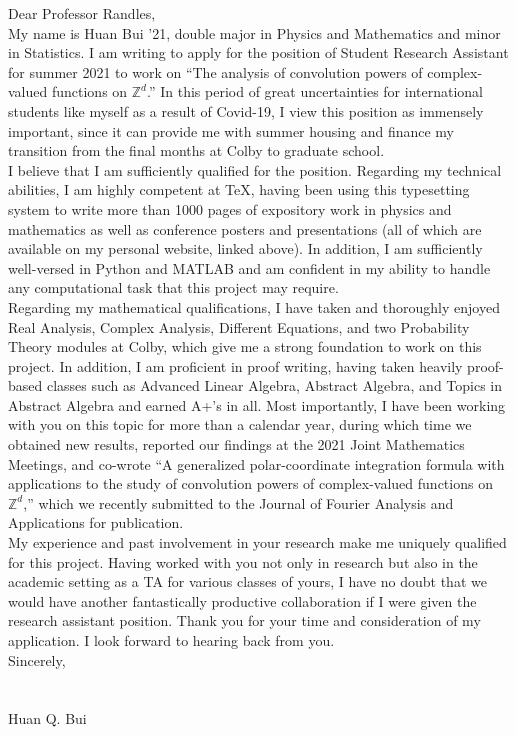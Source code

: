 \documentclass[10pt]{article}
\begin{document}
\noindent Dear Professor Randles, \\

My name is Huan Bui '21, double major in Physics and Mathematics and minor in Statistics. I am writing to apply for the position of Student Research Assistant for summer 2021 to work on ``The analysis of convolution powers of complex-valued functions on $\mathbb{Z}^d$.'' In this period of great uncertainties for international students like myself as a result of Covid-19, I view this position as immensely important, since it can provide me with summer housing and finance my transition from the final months at Colby to graduate school.\\

I believe that I am sufficiently qualified for the position. Regarding my technical abilities, I am highly competent at \TeX{}, having been using this typesetting system to write more than 1000 pages of expository work in physics and mathematics as well as conference posters and presentations (all of which are available on my personal website, linked above). In addition, I am sufficiently well-versed in Python and MATLAB and am confident in my ability to handle any computational task that this project may require. \\


Regarding my mathematical qualifications, I have taken and thoroughly enjoyed Real Analysis, Complex Analysis, Different Equations, and two Probability Theory modules at Colby, which give me a strong foundation to work on this project. In addition, I am proficient in proof writing, having taken heavily proof-based classes such as Advanced Linear Algebra, Abstract Algebra, and Topics in Abstract Algebra and earned A+'s in all. Most importantly, I have been working with you on this topic for more than a calendar year, during which time we obtained new results, reported our findings at the 2021 Joint Mathematics Meetings, and co-wrote ``A generalized polar-coordinate integration formula with applications to the study of convolution powers of complex-valued functions on $\mathbb{Z}^d$,'' which we recently submitted to the Journal of Fourier Analysis and Applications for publication.   \\


My experience and past involvement in your research make me uniquely qualified for this project. Having worked with you not only in research but also in the academic setting as a TA for various classes of yours, I have no doubt that we would have another fantastically productive collaboration if I were given the research assistant position. Thank you for your time and consideration of my application. I look forward to hearing back from you.\\



\noindent Sincerely,
$\,$\\
$\,$\\
$\,$\\
\noindent Huan Q. Bui
\end{document}
